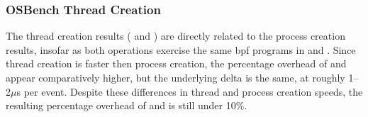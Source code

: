 
\subsubsection{OSBench Thread Creation}

The thread creation results ( and )
are directly related to the process creation results, insofar as both operations exercise
the same \gls{bpf} programs in \bpfbox{} and \bpfcontain{}. Since thread creation is
faster then process creation, the percentage overhead of \bpfbox{} and \bpfcontain{}
appear comparatively higher, but the underlying delta is the same, at roughly 1--2$\mu$s
per event. Despite these differences in thread and process creation speeds, the resulting
percentage overhead of \bpfbox{} and \bpfcontain{} is still under 10\%.

